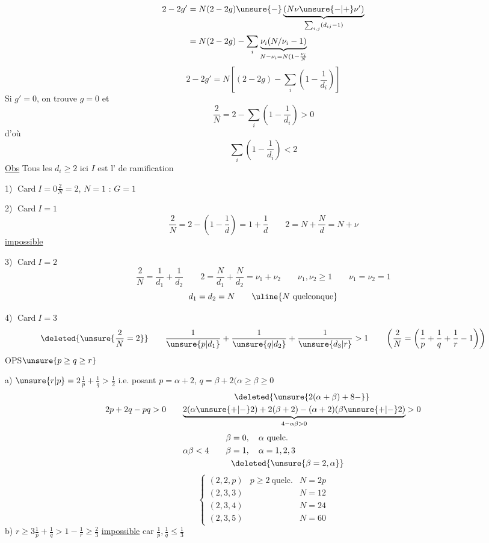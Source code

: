 \[
\begin{aligned}
2-2g'&=N(2-2g)\unsure{-}\underbrace{(N\nu\unsure{-|+}\nu')}_{\sum_{i,j}(d_{ij}-1)}\\
&=N(2-2g)-\sum_i\underbrace{\nu_i(N/\nu_i-1)}_{N-\nu_i=N(1-\frac{\nu_i}{N}}
\end{aligned}
\]
\qquad{}
\[
\boxed{2-2g'=N\left[(2-2g)-\sum_i\left(1-\frac1{d_i}\right)\right]}
\]
Si $g'=0$, on trouve $g=0$ et
\[
\boxed{\frac2N=2-\sum_i\left(1-\frac1{d_i}\right)>0}
\]
d'où
\[\sum_i\left(1-\frac1{d_i}\right)<2\]
\uline{Obs} Tous les $d_i\ge2$  ici $I$ est \uline{} l' de ramification

1) $\operatorname{Card}I=0$\qquad $\frac2N=2$, $N=1$ :  $G=1$

2) $\operatorname{Card}I=1$
\[
\frac2N=2-\left(1-\frac1d\right)=1+\frac1d\qquad
2=N+\frac Nd=N+\nu
\]
\uline{impossible}

3) $\operatorname{Card}I=2$
\[
\frac2N=\frac1{d_1}+\frac1{d_2}\qquad
2=\frac N{d_1}+\frac N{d_2}=\nu_1+\nu_2\qquad
\nu_1,\nu_2\ge1\qquad\nu_1=\nu_2=1
\]
\[d_1=d_2=N\qquad\uline{N\text{ quelconque}}\]

4) $\operatorname{Card}I=3$
\[
\deleted{\unsure{\frac2N=2}}\qquad
\frac1{\unsure{p|d_1}}+\frac1{\unsure{q|d_2}}+\frac1{\unsure{d_3|r}}>1
\qquad\left(\frac2N=\left(\frac1p+\frac1q+\frac1r-1\right)\right)
\]
OPS\qquad $\unsure{p\ge q\ge r}$

 a) $\unsure{r|p}=2$\qquad $\frac1p+\frac1q>\frac12$\qquad
 i.e. posant $p=\alpha+2$, $q=\beta+2$\qquad $(\alpha\ge\beta\ge0$
\margin{\deleted{$\unsure{\alpha}$}}
\[
2p+2q-pq>0\qquad
\begin{gathered}
\deleted{\unsure{2(\alpha+\beta)+8-}}\\
\underbrace{2(\alpha\unsure{+|-}2)+2(\beta+2)-(\alpha+2)(\beta\unsure{+|-}2)}_{4-\alpha\beta>0}>0
\end{gathered}
\]
\[
\alpha\beta<4\qquad
\begin{aligned}
\beta&=0,\quad\alpha\ \text{quelc.}\\
\beta&=1,\quad\alpha=1,2,3\\
&\deleted{\unsure{\beta=2,\alpha}}
\end{aligned}
\]
\[
\left\{\begin{array}{lll}
(2,2,p)&p\ge2\ \text{quelc.}&N=2p\\
(2,3,3)&&N=12\\
(2,3,4)&&N=24\\
(2,3,5)&&N=60
\end{array}\right.
\]
b) $r\ge3$\qquad $\frac1p+\frac1q>1-\frac1r\ge\frac23$\qquad
\uline{impossible} car $\frac1p,\frac1q\le\frac13$


